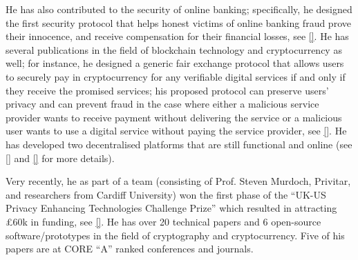 He has also contributed to the security of online banking; specifically, he designed the first security protocol that helps honest victims of online banking fraud prove their innocence, and receive compensation for their financial losses, see \href{https://eprint.iacr.org/2022/107.pdf}{[\printcntr]}. He has several publications in the field of blockchain technology and cryptocurrency as well; for instance, he designed a generic fair exchange protocol that allows users to securely pay in cryptocurrency for any verifiable digital services if and only if they receive the promised services; his proposed protocol can preserve users' privacy and can prevent fraud in the case where either a malicious service provider wants to receive payment without delivering the service or a malicious user wants to use a digital service without paying the service provider, see \href{https://arxiv.org/pdf/2208.00283.pdf}{[\printcntr]}. He has developed two decentralised platforms that are still functional and online (see \href{http://blockchainlab.inf.ed.ac.uk/id-management/#/}{[\printcntr]} and \href{http://blockchainlab.inf.ed.ac.uk/valued/}{[\printcntr]} for more details).


Very recently, he as part of a team (consisting of Prof. Steven Murdoch, Privitar, and researchers from Cardiff University) won the first phase of the “UK-US Privacy Enhancing Technologies Challenge Prize” which resulted in attracting £60k in funding, see \href{https://www.ucl.ac.uk/computer-science/news/2022/dec/ucl-computer-sciences-success-privacy-enhancing-technologies-challenge}{[\printcntr]}.  He has over 20 technical papers and 6 open-source software/prototypes in the field of cryptography and cryptocurrency. Five of his papers are at CORE “A” ranked conferences and journals.